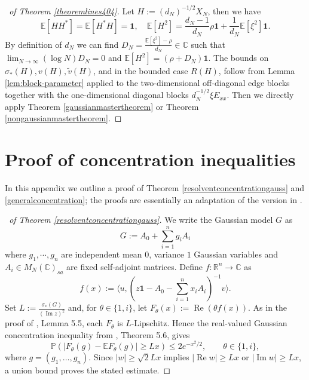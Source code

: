\documentclass[11pt,reqno]{amsart}
\theoremstyle{plain}
\theoremstyle{remark}
\numberwithin{equation}{section}
\begin{document}
\begin{proof}[\proofname\ of Theorem \ref{theoremlines404}]
    Let $H:=(d_N)^{-1/2}X_N$, then we have
    $$
\mathbb{E}[HH^*]=\mathbb{E}[H^*H]=\mathbf{1},\quad \mathbb{E}[H^2]=\frac{d_N-1}{d_N}\rho\mathbf{1}+\frac{1}{d_N}\mathbb{E}[\xi^2]\mathbf{1}.
    $$By definition of $d_N$ we can find $D_N=\frac{\mathbb{E}[\xi^2]-\rho}{d_N}\in\mathbb{C}$ such that $\lim_{N\to\infty}(\log N)D_N=0$ and $\mathbb{E}[H^2]=(\rho+D_N)\mathbf{1}$. The bounds on \(\sigma_*(H),v(H),\widetilde {v}(H)\), and in the bounded case \(R(H)\),
follow from Lemma \ref{lem:block-parameter} applied to the two-dimensional off-diagonal edge blocks
together with the one-dimensional diagonal blocks \(d_N^{-1/2}\xi E_{xx}\). Then we directly apply Theorem \ref{gaussianmastertheorem} or Theorem \ref{nongaussianmastertheorem}. 
\end{proof}

\appendix




\section{Proof of concentration inequalities}
\label{sectionappendixa}
In this appendix we outline a proof of Theorem \ref{resolventconcentrationgauss} and \ref{generalconcentration}; the proofs are essentially an adaptation of the version in \cite{brailovskaya2022universality}. 

\begin{proof}[\proofname\ of Theorem \ref{resolventconcentrationgauss}]

We write the Gaussian model $G$ as
$$
G:=A_0+\sum_{i=1}^n g_iA_i
$$ where $g_1,\cdots,g_n$ are independent mean $0$, variance $1$ Gaussian variables and $A_i\in M_N(\mathbb{C})_{sa}$ are fixed self-adjoint matrices. Define $f:\mathbb{R}^n\to\mathbb{C}$ as
$$
f(x):=\langle u,(z\mathbf{1}-A_0-\sum_{i=1}^nx_iA_i)^{-1}v\rangle.
$$
Set $L:=\frac{\sigma_*(G)}{(\operatorname{Im} z)^2}$ and, for $\theta\in\{1,i\}$, let $F_\theta(x):=\operatorname{Re}(\theta f(x))$. As in the proof of \cite{brailovskaya2022universality}, Lemma 5.5, each $F_\theta$ is $L$-Lipschitz. Hence the real-valued Gaussian concentration inequality from \cite{10.1093/acprof:oso/9780199535255.001.0001}, Theorem 5.6, gives
\[
\mathbb{P}\left(\left|F_\theta(g)-\mathbb{E}F_\theta(g)\right|\geq Lx\right)\leq 2e^{-x^2/2},\qquad \theta\in\{1,i\},
\]
where $g=(g_1,\ldots,g_n)$. Since $|w|\geq\sqrt{2}Lx$ implies $|\operatorname{Re}w|\geq Lx$ or $|\operatorname{Im}w|\geq Lx$, a union bound proves the stated estimate.\end{proof}
\end{document}

